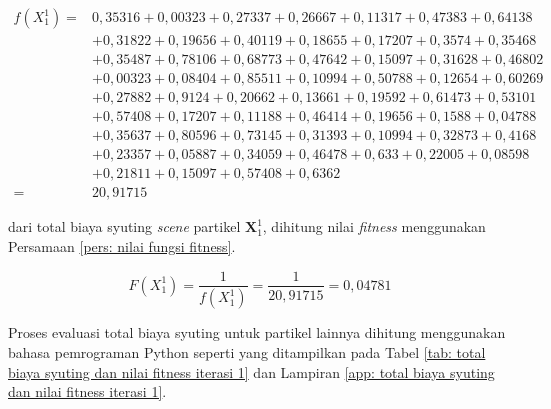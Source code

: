 {{\begin{enumerate}[align = left, left = 0cm, nolistsep]
              {\footnotesize
              \begin{equation*}
                  \begin{aligned}
                      f(X_{1}^{1})  = & 0,35316 + 0,00323 + 0,27337 + 0,26667 + 0,11317 + 0,47383 + 0,64138   \\
                                      & + 0,31822 + 0,19656 + 0,40119 + 0,18655 + 0,17207 + 0,3574 + 0,35468  \\
                                      & + 0,35487 + 0,78106 + 0,68773 + 0,47642 + 0,15097 + 0,31628 + 0,46802 \\
                                      & + 0,00323 + 0,08404 + 0,85511 + 0,10994 + 0,50788 + 0,12654 + 0,60269 \\
                                      & + 0,27882 + 0,9124 + 0,20662 + 0,13661 + 0,19592 + 0,61473 + 0,53101  \\
                                      & + 0,57408 + 0,17207 + 0,11188 + 0,46414 + 0,19656 + 0,1588 + 0,04788  \\
                                      & + 0,35637 + 0,80596 + 0,73145 + 0,31393 + 0,10994 + 0,32873 + 0,4168  \\
                                      & + 0,23357 + 0,05887 + 0,34059 + 0,46478 + 0,633 + 0,22005 + 0,08598   \\
                                      & + 0,21811 + 0,15097 + 0,57408 + 0,6362                                \\
                      =               & 20,91715
                  \end{aligned}
              \end{equation*}
              }

              dari total biaya syuting \textit{scene} partikel $\boldsymbol{X}_{1}^{1}$, dihitung nilai \textit{fitness} menggunakan Persamaan \ref{pers: nilai fungsi fitness}.

              \begin{equation*}
                  F(X_{1}^{1}) = \frac{1}{f(X_{1}^{1})} = \frac{1}{20,91715} = 0,04781
              \end{equation*}

              Proses evaluasi total biaya syuting untuk partikel lainnya dihitung menggunakan bahasa pemrograman Python seperti yang ditampilkan pada Tabel \ref{tab: total biaya syuting dan nilai fitness iterasi 1} dan Lampiran \ref{app: total biaya syuting dan nilai fitness iterasi 1}.


\end{enumerate}}}
